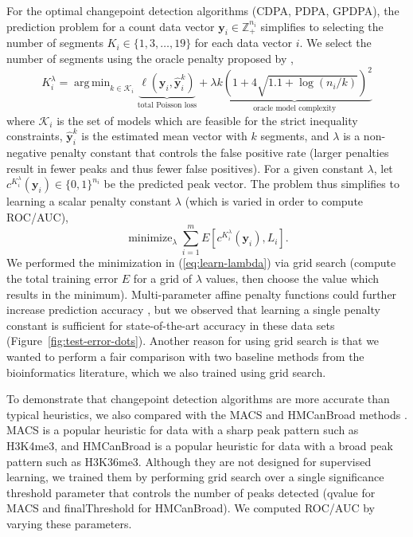 \documentclass[aoas]{imsart}
\DeclareMathOperator*{\argmin}{arg\,min}
\DeclareMathOperator*{\minimize}{minimize}
\newcommand{\ZZ}{\mathbb Z}
\begin{document}
For the optimal changepoint detection algorithms (CDPA, PDPA, GPDPA),
the prediction problem for a count data vector
$\mathbf y_i\in\ZZ_+^{n_i}$ simplifies to selecting the number of
segments $K_i\in \{1, 3,\dots, 19\}$ for each data vector $i$.
We select the number of segments
using the oracle penalty proposed by \citet{cleynen2013segmentation},
\begin{equation}
  K_i^\lambda=\argmin_{k\in \mathcal K_i} \underbrace{\ell(\mathbf y_i, \mathbf{\hat y}^k_i)}_{\text{total Poisson loss}} 
+ \lambda 
\underbrace{
k\left(
1 + 4\sqrt{1.1 + \log( n_i/k)}
\right)^2
}_{\text{
oracle model complexity
}}
\end{equation}
where $\mathcal K_i$ is the set of models which are feasible for the
strict inequality constraints, $\mathbf{\hat y}^k_i$ is the estimated
mean vector with $k$ segments, and $\lambda$ is a non-negative penalty
constant that controls the false positive rate (larger penalties
result in fewer peaks and thus fewer false positives). For a given
constant $\lambda$, let $c^{K_i^\lambda}(\mathbf y_i)\in\{0,1\}^{n_i}$
be the predicted peak vector. The problem thus simplifies to learning
a scalar penalty constant $\lambda$ (which is varied in order to
compute ROC/AUC),
\begin{equation}
  \label{eq:learn-lambda}
  \minimize_{\lambda}
  \sum_{i=1}^m E\left[
    c^{K_i^\lambda}(\mathbf y_i), 
    L_i\right].
\end{equation}
We performed the minimization in
(\ref{eq:learn-lambda}) via grid search (compute the total training error $E$
for a grid of $\lambda$ values, then choose the value which results in
the minimum). Multi-parameter affine penalty functions could further
increase prediction accuracy \citep{HOCKING-penalties}, but we
observed that learning a single penalty constant is sufficient for
state-of-the-art accuracy in these data sets
(Figure~\ref{fig:test-error-dots}). Another reason for using grid
search is that we wanted to perform a fair comparison with two
baseline methods from the bioinformatics literature, which we also
trained using grid search.

To demonstrate that changepoint detection algorithms are more accurate
than typical heuristics, we also
compared with the MACS and HMCanBroad methods \citep{MACS,
  HMCan}. MACS is a popular heuristic for data with a sharp peak
pattern such as H3K4me3, and \mbox{HMCanBroad} is a popular heuristic
for data with a broad peak pattern such as H3K36me3. Although they are
not designed for supervised learning, we trained them by performing
grid search over a single significance threshold parameter that
controls the number of peaks detected (qvalue for MACS and
finalThreshold for HMCanBroad). We computed ROC/AUC by varying these
parameters.
\end{document}
